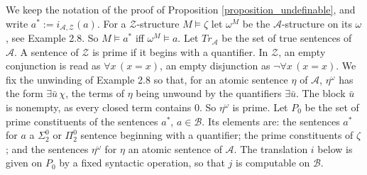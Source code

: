 \documentclass{amsart}  %
\numberwithin{equation}{section}
\theoremstyle{definition}
\theoremstyle{remark}
\begin{document}
We keep the notation of the proof of Proposition \ref{proposition_undefinable}, and write $a ^{\ast} := i _{\mathcal{A}, \mathcal{Z}} (a)$. For a $\mathcal{Z}$-structure $M \models \zeta$ let $\omega ^{M}$ be the $\mathcal{A}$-structure on its $\omega$, see Example 2.8. So $M \models a ^{\ast}$ iff $\omega ^{M} \models a$. Let $Tr _{\mathcal{A}}$ be the set of true sentences of $\mathcal{A}$. A sentence of $\mathcal{Z}$ is prime if it begins with a quantifier. In $\mathcal{Z}$, an empty conjunction is read as $\forall x \, (x = x)$, an empty disjunction as $\neg \forall x \, (x = x)$. We fix the unwinding of Example 2.8 so that, for an atomic sentence $\eta$ of $\mathcal{A}$, $\eta ^{\omega}$ has the form $\exists \bar{u} \, \chi$, the terms of $\eta$ being unwound by the quantifiers $\exists \bar{u}$. The block $\bar{u}$ is nonempty, as every closed term contains $0$. So $\eta ^{\omega}$ is prime. Let $P _{0}$ be the set of prime constituents of the sentences $a ^{\ast}$, $a \in \mathcal{B}$. Its elements are: the sentences $a ^{\ast}$ for $a$ a $\Sigma ^{0} _{2}$ or $\Pi ^{0} _{2}$ sentence beginning with a quantifier; the prime constituents of $\zeta$; and the sentences $\eta ^{\omega}$ for $\eta$ an atomic sentence of $\mathcal{A}$. The translation $i$ below is given on $P _{0}$ by a fixed syntactic operation, so that $j$ is computable on $\mathcal{B}$.
\end{document}
